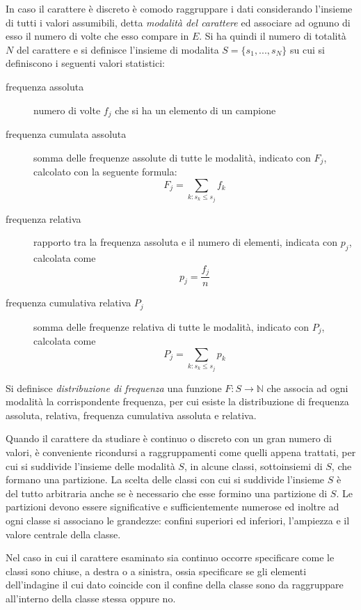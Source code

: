 \documentclass[a4paper,12pt, oneside]{book}
\newcommand{\numberset}{\mathbb}
\newcommand{\N}{\numberset{N}}
\begin{document}
In caso il carattere è discreto è comodo raggruppare i dati considerando l'insieme di tutti i valori assumibili,
detta \emph{modalità del carattere} ed associare ad ognuno di esso il numero di volte che esso compare in $E$.\newline
Si ha quindi il numero di totalità $N$ del carattere e si definisce l'insieme di modalita $S=\{s_1,...,s_N\}$
su cui si definiscono i seguenti valori statistici:
\begin{description}
    \item [frequenza assoluta ] numero di volte $f_j$ che si ha un elemento di un campione
    \item [frequenza cumulata assoluta] somma delle frequenze assolute di tutte le modalità, 
           indicato con $F_j$, calcolato con la seguente formula:
            \[ F_j = \sum_{k:s_k \leq s_j} f_k \]
    \item [frequenza relativa] rapporto tra la frequenza assoluta e il numero di elementi,
           indicata con $p_j$, calcolata come 
            \[ p_j = \frac{f_j}{n} \]
    \item [frequenza cumulativa relativa $P_j$] somma delle frequenze relativa di tutte le modalità,
           indicato con $P_j$, calcolata come 
            \[ P_j = \sum_{k:s_k \leq s_j} p_k \]
\end{description}
Si definisce \emph{distribuzione di frequenza} una funzione $F:S \to \N$ che associa ad ogni modalità 
la corrispondente frequenza, per cui esiste la distribuzione di frequenza assoluta, relativa, 
frequenza cumulativa assoluta e relativa.

Quando il carattere da studiare è continuo o discreto con un gran numero di valori, è conveniente 
ricondursi a raggruppamenti come quelli appena trattati, per cui si suddivide l'insieme delle modalità $S$,
in alcune classi, sottoinsiemi di $S$, che formano una partizione.\newline
La scelta delle classi con cui si suddivide l'insieme $S$ è del tutto arbitraria anche se è necessario
che esse formino una partizione di $S$.\newline
Le partizioni devono essere significative e sufficientemente numerose ed inoltre ad ogni classe si associano le grandezze:
confini superiori ed inferiori, l'ampiezza e il valore centrale della classe.

Nel caso in cui il carattere esaminato sia continuo occorre specificare come le classi sono chiuse, a destra o a sinistra,
ossia specificare se gli elementi dell'indagine il cui dato coincide con il confine della classe sono da raggruppare
all'interno della classe stessa oppure no.
\end{document}
